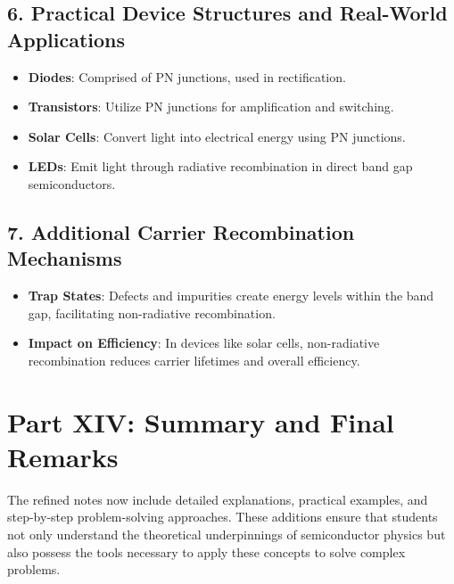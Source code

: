 \documentclass[12pt]{article}
\begin{document}
\subsection{6. Practical Device Structures and Real-World Applications}
\begin{itemize}
    \item \textbf{Diodes}: Comprised of PN junctions, used in rectification.
    \item \textbf{Transistors}: Utilize PN junctions for amplification and switching.
    \item \textbf{Solar Cells}: Convert light into electrical energy using PN junctions.
    \item \textbf{LEDs}: Emit light through radiative recombination in direct band gap semiconductors.
\end{itemize}

\subsection{7. Additional Carrier Recombination Mechanisms}
\begin{itemize}
    \item \textbf{Trap States}: Defects and impurities create energy levels within the band gap, facilitating non-radiative recombination.
    \item \textbf{Impact on Efficiency}: In devices like solar cells, non-radiative recombination reduces carrier lifetimes and overall efficiency.
\end{itemize}

\section{Part XIV: Summary and Final Remarks}

The refined notes now include detailed explanations, practical examples, and step-by-step problem-solving approaches. These additions ensure that students not only understand the theoretical underpinnings of semiconductor physics but also possess the tools necessary to apply these concepts to solve complex problems.
\end{document}
